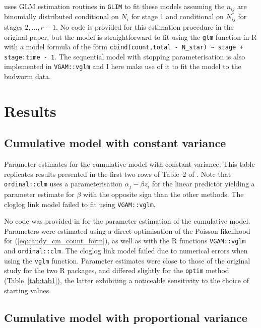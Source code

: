 \citet{candy1991modeling} uses GLM estimation routines in \verb+GLIM+ to fit these models assuming the $n_{ij}$ are binomially distributed conditional on $N_i$ for stage 1 and conditional on $N^*_{ij}$ for stages $2,\dots,r-1$. 
No code is provided for this estimation procedure in the original paper, but the model is straightforward to fit using the \verb+glm+ function in R with a model formula of the form \verb!cbind(count,total - N_star) ~ stage + stage:time - 1!.  
The sequential model with stopping parameterisation is also implemented in \verb+VGAM::vglm+ \citep{VGAM} and I here make use of it to fit the model to the budworm data.


\section{Results}
\subsection{Cumulative model with constant variance}

\begin{table}[b]
  \small
    \centering
    \caption{Parameter estimates for the cumulative model with constant variance. 
    This table replicates results presented in the first two rows of Table~2 of \citep{candy1991modeling}. 
    Note that \texttt{ordinal::clm} uses a parameterisation $\alpha_j - \beta z_i$ for the linear predictor yielding a parameter estimate for $\beta$ with the opposite sign than the other methods. 
    The cloglog link model failed to fit using \texttt{VGAM::vglm}.}
  
  \label{tab:tab1}
\end{table}

No code was provided in \citep{candy1991modeling} for the parameter estimation of the cumulative model. 
Parameters were estimated using a direct optimisation of the Poisson likelihood for (\ref{eq:candy_cm_count_form}), as well as with the R functions \verb+VGAM::vglm+ and \verb+ordinal::clm+. 
The cloglog link model failed due to numerical errors when using the \verb+vglm+ function. 
Parameter estimates were close to those of the original study for the two R packages, and differed slightly for the \verb+optim+ method (Table~\ref{tab:tab1}), the latter exhibiting a noticeable sensitivity to the choice of starting values.

\subsection{Cumulative model with proportional variance}

